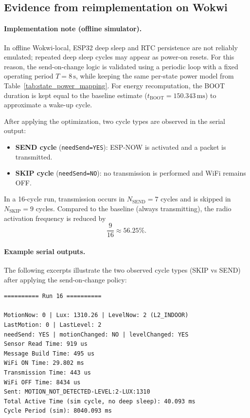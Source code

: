 \documentclass{article}
\begin{document}
\subsection{Evidence from reimplementation on Wokwi}
\label{subsec:evidence_wokwi}

\paragraph{Implementation note (offline simulator).}
In offline Wokwi-local, ESP32 deep sleep and RTC persistence are not reliably emulated; repeated deep sleep cycles may appear as power-on resets.
For this reason, the send-on-change logic is validated using a periodic loop with a fixed operating period \(T=8\,\mathrm{s}\),
while keeping the same per-state power model from Table~\ref{tab:state_power_mapping}.
For energy recomputation, the BOOT duration is kept equal to the baseline estimate
(\(t_{\mathrm{BOOT}}=150.343\,\mathrm{ms}\)) to approximate a wake-up cycle.

After applying the optimization, two cycle types are observed in the serial output:
\begin{itemize}
  \item \textbf{SEND cycle} (\texttt{needSend=YES}): ESP-NOW is activated and a packet is transmitted.
  \item \textbf{SKIP cycle} (\texttt{needSend=NO}): no transmission is performed and WiFi remains OFF.
\end{itemize}

In a 16-cycle run, transmission occurs in \(N_{\mathrm{SEND}}=7\) cycles and is skipped in \(N_{\mathrm{SKIP}}=9\) cycles.
Compared to the baseline (always transmitting), the radio activation frequency is reduced by
\[
\frac{9}{16}\approx 56.25\%.
\]

\paragraph{Example serial outputs.}
The following excerpts illustrate the two observed cycle types (SKIP vs SEND) after applying the send-on-change policy:

\begin{verbatim}
========== Run 16 ==========

MotionNow: 0 | Lux: 1310.26 | LevelNow: 2 (L2_INDOOR)
LastMotion: 0 | LastLevel: 2
needSend: YES | motionChanged: NO | levelChanged: YES
Sensor Read Time: 919 us
Message Build Time: 495 us
WiFi ON Time: 29.802 ms
Transmission Time: 443 us
WiFi OFF Time: 8434 us
Sent: MOTION_NOT_DETECTED-LEVEL:2-LUX:1310
Total Active Time (sim cycle, no deep sleep): 40.093 ms
Cycle Period (sim): 8040.093 ms
\end{verbatim}
\end{document}
